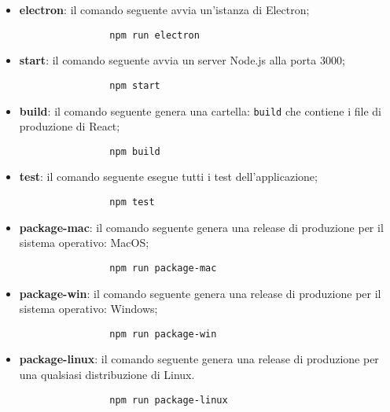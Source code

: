 \begin{itemize}
        \begin{itemize}
            \item \textbf{electron}: il comando seguente avvia un'istanza di Electron;
            \begin{verbatim}
            	npm run electron
            \end{verbatim}
            \item \textbf{start}: il comando seguente avvia un server Node.js alla porta 3000;
            \begin{verbatim}
	            npm start
            \end{verbatim}
            \item \textbf{build}: il comando seguente genera una cartella: \verb|build| che contiene i file di produzione di React;
            \begin{verbatim}
            	npm build
            \end{verbatim}
            \item \textbf{test}: il comando seguente esegue tutti i test dell'applicazione;\\
            \begin{verbatim}
            	npm test
            \end{verbatim}
            \item \textbf{package-mac}: il comando seguente genera una release di produzione per il sistema operativo: MacOS;
            \begin{verbatim}
            	npm run package-mac
            \end{verbatim}
            \item \textbf{package-win}: il comando seguente genera una release di produzione per il sistema operativo: Windows;
            \begin{verbatim}
            	npm run package-win
            \end{verbatim}
            \item \textbf{package-linux}: il comando seguente genera una release di produzione per una qualsiasi distribuzione di Linux.
            \begin{verbatim}
            	npm run package-linux
            \end{verbatim}
        \end{itemize}
\end{itemize}
